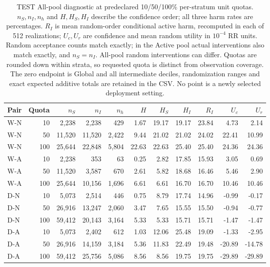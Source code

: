 \begin{table}[htbp]
\centering\footnotesize\setlength{\tabcolsep}{3pt}
\caption{TEST All-pool diagnostic at predeclared 10/50/100\% per-stratum unit quotas. $n_S,n_I,n_h$ and $H,H_S,H_I$ describe the confidence order; all three harm rates are percentages. $R_I$ is mean random-order conditional active harm, recomputed in each of 512 realizations; $U_c,U_r$ are confidence and mean random utility in $10^{-4}$ RR units. Random acceptance counts match exactly; in the Active pool actual interventions also match exactly, and $n_S=n_I$. All-pool random interventions can differ. Quotas are rounded down within strata, so requested quota is distinct from observation coverage. The zero endpoint is Global and all intermediate deciles, randomization ranges and exact expected additive totals are retained in the CSV. No point is a newly selected deployment setting.}
\label{tab:coverage-counts_all}
\begin{tabular}{lrrrrrrrrrr}
\toprule
Pair & Quota & $n_S$ & $n_I$ & $n_h$ & $H$ & $H_S$ & $H_I$ & $R_I$ & $U_c$ & $U_r$\\
\midrule
W-N & 10 & 2,238 & 2,238 & 429 & 1.67 & 19.17 & 19.17 & 23.84 & 4.73 & 2.14\\
W-N & 50 & 11,520 & 11,520 & 2,422 & 9.44 & 21.02 & 21.02 & 24.02 & 22.41 & 10.99\\
W-N & 100 & 25,644 & 22,848 & 5,804 & 22.63 & 22.63 & 25.40 & 25.40 & 24.36 & 24.36\\
W-A & 10 & 2,238 & 353 & 63 & 0.25 & 2.82 & 17.85 & 15.93 & 3.05 & 0.69\\
W-A & 50 & 11,520 & 3,587 & 670 & 2.61 & 5.82 & 18.68 & 16.46 & 5.46 & 2.90\\
W-A & 100 & 25,644 & 10,156 & 1,696 & 6.61 & 6.61 & 16.70 & 16.70 & 10.46 & 10.46\\
D-N & 10 & 5,073 & 2,514 & 446 & 0.75 & 8.79 & 17.74 & 14.96 & -0.99 & -0.17\\
D-N & 50 & 26,916 & 13,247 & 2,060 & 3.47 & 7.65 & 15.55 & 15.50 & -0.94 & -0.77\\
D-N & 100 & 59,412 & 20,143 & 3,164 & 5.33 & 5.33 & 15.71 & 15.71 & -1.47 & -1.47\\
D-A & 10 & 5,073 & 2,402 & 612 & 1.03 & 12.06 & 25.48 & 19.09 & -1.33 & -2.95\\
D-A & 50 & 26,916 & 14,159 & 3,184 & 5.36 & 11.83 & 22.49 & 19.48 & -20.89 & -14.78\\
D-A & 100 & 59,412 & 25,756 & 5,086 & 8.56 & 8.56 & 19.75 & 19.75 & -29.89 & -29.89\\

\end{tabular}
\end{table}

